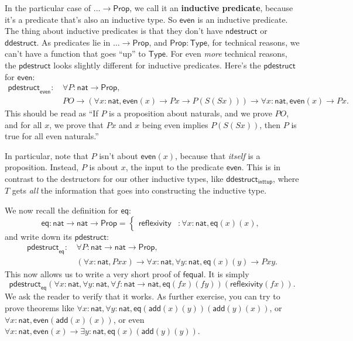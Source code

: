 \documentclass[11pt,paper=letter]{scrartcl}
\renewcommand{\sf}{\mathsf}
\newcommand{\prop}{\mathsf{Prop}}
\newcommand{\type}{\mathsf{Type}}
\begin{document}
In the particular case of $\dots \to \prop$, we call it an \textbf{inductive predicate}, because it's a predicate that's also an inductive type. So $\sf{even}$ is an inductive predicate. The thing about inductive predicates is that they don't have $\sf{ndestruct}$ or $\sf{ddestruct}$. As predicates lie in $\dots \to \prop$, and $\prop : \type$, for technical reasons, we can't have a function that goes ``up'' to $\type$. For even \emph{more} technical reasons, the $\sf{pdestruct}$ looks slightly different for inductive predicates. Here's the $\sf{pdestruct}$ for $\sf{even}$:
\begin{align*}
\sf{pdestruct}_\sf{even}:\,
& \forall P: \sf{nat} \to \prop,\\
& PO \to
  (\forall x: \sf{nat}, \sf{even}(x) \to Px \to P(S(Sx))) \to
  \forall x: \sf{nat}, \sf{even}(x) \to Px.
\end{align*}
This should be read as ``If $P$ is a proposition about naturals, and we prove $PO$, and for all $x$, we prove that $Px$ and $x$ being even implies $P(S(Sx))$, then $P$ is true for all even naturals.''

In particular, note that $P$ isn't about $\sf{even}(x)$, because that \emph{itself} is a proposition. Instead, $P$ is about $x$, the input to the predicate $\sf{even}$. This is in contrast to the destructors for our other inductive types, like $\sf{ddestruct}_{\sf{inttup}}$, where $T$ gets \emph{all} the information that goes into constructing the inductive type.

We now recall the definition for $\sf{eq}$: \[
\sf{eq}: \sf{nat} \to \sf{nat} \to \prop =
  \begin{cases}
  \sf{reflexivity}&: \forall x: \sf{nat}, \sf{eq}(x)(x),
  \end{cases}
\]
and write down its $\sf{pdestruct}$:
\begin{align*}
\sf{pdestruct}_\sf{eq}:\,
& \forall P: \sf{nat} \to \sf{nat} \to \prop, \\
& (\forall x: \sf{nat}, Pxx) \to
  \forall x: \sf{nat}, \forall y: \sf{nat}, \sf{eq}(x)(y) \to Pxy.
\end{align*}
This now allows us to write a very short proof of $\sf{fequal}$. It is simply \[
  \sf{pdestruct}_\sf{eq}(\forall x: \sf{nat}, \forall y: \sf{nat}, \forall f: \sf{nat} \to \sf{nat}, \sf{eq}(fx)(fy))(\sf{reflexivity}(fx)).
\]
We ask the reader to verify that it works. As further exercise, you can try to prove theorems like $\forall x: \sf{nat}, \forall y: \sf{nat}, \sf{eq}(\sf{add}(x)(y))(\sf{add}(y)(x))$, or $\forall x: \sf{nat}, \sf{even}(\sf{add}(x)(x))$, or even $\forall x: \sf{nat}, \sf{even}(x) \to \exists y: \sf{nat}, \sf{eq}(x)(\sf{add}(y)(y))$.
\end{document}
